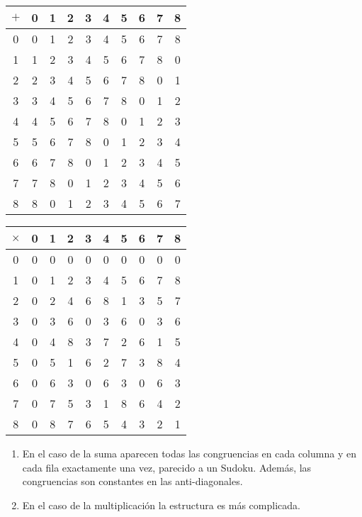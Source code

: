   \begin{center}
  \begin{tabular}{|c||c|c|c|c|c|c|c|c|c|} 
 \hline
  $+$ & 0 & 1 & 2 & 3 & 4 & 5 & 6 & 7 & 8 \\ 
  \hline
  \hline
  0 & 0 & 1 & 2 & 3 & 4 & 5 & 6 & 7 & 8 \\ 
  \hline
  1 & 1 & 2 & 3 & 4 & 5 & 6 & 7 & 8 & 0 \\
  \hline
  2 & 2 & 3 & 4 & 5 & 6 & 7 & 8 & 0 & 1\\ 
  \hline
  3 & 3 & 4 & 5 & 6 & 7 & 8 & 0 & 1 & 2\\ 
  \hline
  4 & 4 & 5 & 6 & 7 & 8 & 0 & 1 & 2 & 3\\ 
  \hline  
  5 & 5 & 6 & 7 & 8 & 0 & 1 & 2 & 3 & 4\\
    \hline
  6 & 6 & 7 & 8 & 0 & 1 & 2 & 3 & 4 & 5\\ 
    \hline
  7 & 7 & 8 & 0 & 1 & 2 & 3 & 4 & 5 & 6 \\ 
    \hline
  8 & 8 & 0 & 1 & 2 & 3 & 4 & 5 & 6 & 7 \\ 
  \hline  
  \end{tabular}
  \hspace{2cm}
  \begin{tabular}{|c||c|c|c|c|c|c|c|c|c|} 
 \hline
  $\times$ & 0 & 1 & 2 & 3 & 4 & 5 & 6 & 7 & 8 \\ 
  \hline
  \hline
  0 & 0 & 0 & 0 & 0 & 0 & 0 & 0 & 0 & 0 \\ 
  \hline
  1 & 0 & 1 & 2 & 3 & 4 & 5 & 6 & 7 & 8\\ 
  \hline
  2 & 0 & 2 & 4 & 6 & 8 & 1 & 3 & 5 & 7\\ 
  \hline
  3 & 0 & 3 & 6 & 0 & 3 & 6 & 0 & 3 & 6\\ 
  \hline
  4 & 0 & 4 & 8 & 3 & 7 & 2 & 6 & 1 & 5\\ 
  \hline  
  5 & 0 & 5 & 1 & 6 & 2 & 7 & 3 & 8 & 4\\
    \hline
  6 & 0 & 6 & 3 & 0 & 6 & 3 & 0 & 6 & 3 \\ 
    \hline
  7 & 0 & 7 & 5 & 3 & 1 & 8 & 6 & 4 & 2 \\ 
    \hline
  8 & 0 & 8 & 7 & 6 & 5 & 4 & 3 & 2 & 1 \\ 
  \hline  
  \end{tabular}
  \end{center}

\begin{observacion}
\begin{enumerate}
    \item En el caso de la suma aparecen todas las congruencias en cada columna y en cada fila exactamente una vez, parecido a un Sudoku. Además, las congruencias son constantes en las anti-diagonales.
    \item En el caso de la multiplicación la estructura es más complicada.
\end{enumerate} 
\end{observacion}   


